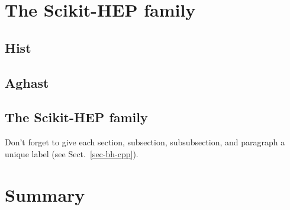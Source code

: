\documentclass{webofc}
\begin{document}
\section{The Scikit-HEP family}
\label{sec-3}

\subsection{Hist}
\subsection{Aghast}
\subsection{The Scikit-HEP family}

Don't forget to give each section, subsection, subsubsection, and
paragraph a unique label (see Sect.~\ref{sec-bh-cpp}).

\section{Summary}
\label{sec-4}

% 
\end{document}
